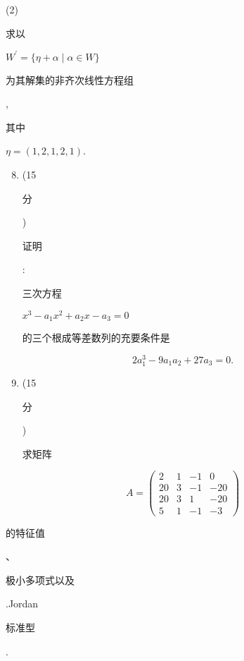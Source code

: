 \documentclass[10pt]{article}
\begin{document}
(2) \begin{CJK}{UTF8}{mj}求以\end{CJK} $W^{\prime}=\{\eta+\alpha \mid \alpha \in W\}$ \begin{CJK}{UTF8}{mj}为其解集的非齐次线性方程组\end{CJK}, \begin{CJK}{UTF8}{mj}其中\end{CJK} $\eta=(1,2,1,2,1)$.

\begin{enumerate}
  \setcounter{enumi}{7}
  \item (15 \begin{CJK}{UTF8}{mj}分\end{CJK}) \begin{CJK}{UTF8}{mj}证明\end{CJK}: \begin{CJK}{UTF8}{mj}三次方程\end{CJK} $x^{3}-a_{1} x^{2}+a_{2} x-a_{3}=0$ \begin{CJK}{UTF8}{mj}的三个根成等差数列的充要条件是\end{CJK}
\end{enumerate}
$$
2 a_{1}^{3}-9 a_{1} a_{2}+27 a_{3}=0 .
$$

\begin{enumerate}
  \setcounter{enumi}{8}
  \item (15 \begin{CJK}{UTF8}{mj}分\end{CJK}) \begin{CJK}{UTF8}{mj}求矩阵\end{CJK}
\end{enumerate}
$$
A=\left(\begin{array}{cccc}
2 & 1 & -1 & 0 \\
20 & 3 & -1 & -20 \\
20 & 3 & 1 & -20 \\
5 & 1 & -1 & -3
\end{array}\right)
$$
\begin{CJK}{UTF8}{mj}的特征值\end{CJK}、\begin{CJK}{UTF8}{mj}极小多项式以及\end{CJK}.Jordan \begin{CJK}{UTF8}{mj}标准型\end{CJK}.
\end{document}

